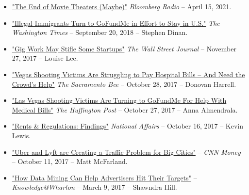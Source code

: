 \documentclass[10.5pt,letterpaper,sans]{moderncv}        %
\begin{document}
\begin{itemize}

\item \textcolor{gray}{\href{https://www.bloomberg.com/news/audio/2021-04-15/baystate-business-the-end-of-movie-theaters-maybe-radio}{"The End of Movie Theaters (Maybe)"}} \textit{Bloomberg Radio} -- April 15, 2021.

\item \textcolor{gray}{\href{https://www.washingtontimes.com/news/2018/sep/20/pro-trumpers-turn-gofundme-build-border-wall/}{"Illegal Immigrants Turn to GoFundMe in Effort to Stay in U.S."}} \textit{The Washington Times} -- September 20, 2018 -- Stephen Dinan.

\item \textcolor{gray}{\href{https://www.wsj.com/articles/gig-work-may-stifle-some-startups-1511751901}{"Gig Work May Stifle Some Startups"}}  \textit{The Wall Street Journal} 
-- November 27, 2017 -- Louise Lee.

\item \textcolor{gray}{\href{http://www.sacbee.com/news/nation-world/national/article181505276.html}{"Vegas Shooting Victims Are Struggling to Pay Hospital Bills -- And Need the Crowd's Help"}} \textit{The Sacramento Bee} -- October 28, 2017 -- Donovan Harrell.

\item \textcolor{gray}{\href{https://www.huffingtonpost.com/entry/vegas-shooting-victims-crowdfunding_us_59f3a51be4b07fdc5fbe465c}{"Las Vegas Shooting Victims Are Turning to GoFundMe For Help With Medical Bills"}} \textit{The Huffington Post} -- October 27, 2017 -- Anna Almendrala.

\item \textcolor{gray}{\href{https://nationalaffairs.com/blog/detail/findings-a-daily-roundup/rents-and-regulations}{"Rents \& Regulations: Findings"}} \textit{National Affairs} -- October 16, 2017 -- Kevin Lewis.

\item \textcolor{gray}{\href{https://money.cnn.com/2017/10/11/technology/future/ride-hailing-cities-public-transit/index.html?section=money_topstories}{"Uber and Lyft are Creating a Traffic Problem for Big Cities"}} -- \textit{CNN Money} -- October 11, 2017 -- Matt McFarland.

\item \textcolor{gray}{\href{http://knowledge.wharton.upenn.edu/article/how-data-mining-can-help-advertisers/}{"How Data Mining Can Help Advertisers Hit Their Targets"}} -- \textit{Knowledge@Wharton} -- March 9, 2017 -- Shawndra Hill.


\end{itemize}
\end{document}
